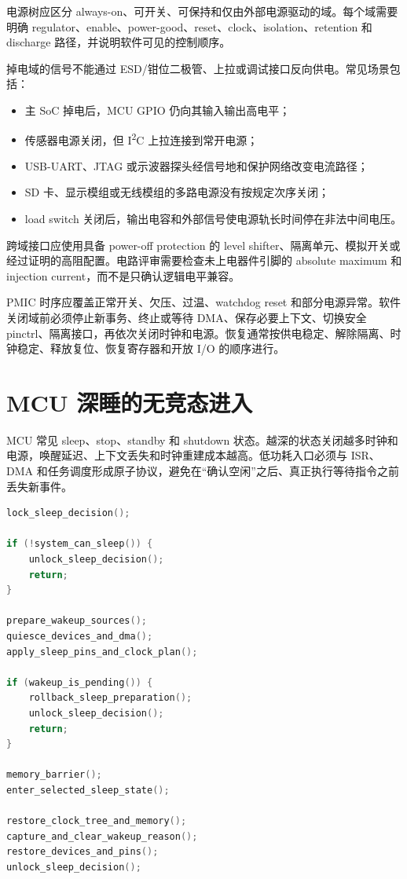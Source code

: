 电源树应区分 always-on、可开关、可保持和仅由外部电源驱动的域。每个域需要明确 regulator、enable、power-good、reset、clock、isolation、retention 和 discharge 路径，并说明软件可见的控制顺序。

掉电域的信号不能通过 ESD/钳位二极管、上拉或调试接口反向供电。常见场景包括：

\begin{itemize}
  \item 主 SoC 掉电后，MCU GPIO 仍向其输入输出高电平；
  \item 传感器电源关闭，但 I\textsuperscript{2}C 上拉连接到常开电源；
  \item USB-UART、JTAG 或示波器探头经信号地和保护网络改变电流路径；
  \item SD 卡、显示模组或无线模组的多路电源没有按规定次序关闭；
  \item load switch 关闭后，输出电容和外部信号使电源轨长时间停在非法中间电压。
\end{itemize}

跨域接口应使用具备 power-off protection 的 level shifter、隔离单元、模拟开关或经过证明的高阻配置。电路评审需要检查未上电器件引脚的 absolute maximum 和 injection current，而不是只确认逻辑电平兼容。

PMIC 时序应覆盖正常开关、欠压、过温、watchdog reset 和部分电源异常。软件关闭域前必须停止新事务、终止或等待 DMA、保存必要上下文、切换安全 pinctrl、隔离接口，再依次关闭时钟和电源。恢复通常按供电稳定、解除隔离、时钟稳定、释放复位、恢复寄存器和开放 I/O 的顺序进行。

\section{MCU 深睡的无竞态进入}

MCU 常见 sleep、stop、standby 和 shutdown 状态。越深的状态关闭越多时钟和电源，唤醒延迟、上下文丢失和时钟重建成本越高。低功耗入口必须与 ISR、DMA 和任务调度形成原子协议，避免在“确认空闲”之后、真正执行等待指令之前丢失新事件。

\begin{lstlisting}[language=C,caption={MCU 低功耗入口的逻辑顺序（伪代码）}]
lock_sleep_decision();

if (!system_can_sleep()) {
    unlock_sleep_decision();
    return;
}

prepare_wakeup_sources();
quiesce_devices_and_dma();
apply_sleep_pins_and_clock_plan();

if (wakeup_is_pending()) {
    rollback_sleep_preparation();
    unlock_sleep_decision();
    return;
}

memory_barrier();
enter_selected_sleep_state();

restore_clock_tree_and_memory();
capture_and_clear_wakeup_reason();
restore_devices_and_pins();
unlock_sleep_decision();
\end{lstlisting}

